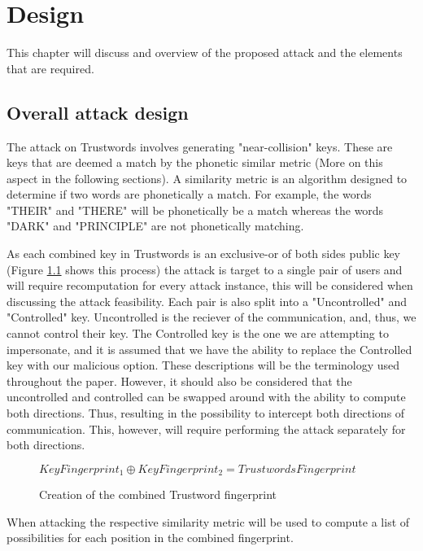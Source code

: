\chapter{Design}
\label{cha:Design}

This chapter will discuss and overview of the proposed attack and the elements that are required.

\section{Overall attack design}

The attack on Trustwords involves generating "near-collision" keys. These are keys that are deemed a match by the phonetic similar metric (More on this aspect in the following sections). A similarity metric is an algorithm designed to determine if two words are phonetically a match. For example, the words "THEIR" and "THERE" will be phonetically be a match whereas the words "DARK" and "PRINCIPLE" are not phonetically matching.

As each combined key in Trustwords is an exclusive-or of both sides public key (Figure \ref{fig:xor_trustwords} shows this process) the attack is target to a single pair of users and will require recomputation for every attack instance, this will be considered when discussing the attack feasibility. Each pair is also split into a "Uncontrolled" and "Controlled" key. Uncontrolled is the reciever of the communication, and, thus, we cannot control their key. The Controlled key is the one we are attempting to impersonate, and it is assumed that we have the ability to replace the Controlled key with our malicious option. These descriptions will be the terminology used throughout the paper. However, it should also be considered that the uncontrolled and controlled can be swapped around with the ability to compute both directions. Thus, resulting in the possibility to intercept both directions of communication. This, however, will require performing the attack separately for both directions.

\begin{figure}[h!]
    \centering
    $KeyFingerprint_{1} \oplus KeyFingerprint_{2} = TrustwordsFingerprint$
    \caption{Creation of the combined Trustword fingerprint}
    \label{fig:xor_trustwords}
\end{figure}

When attacking the respective similarity metric will be used to compute a list of possibilities for each position in the combined fingerprint.

